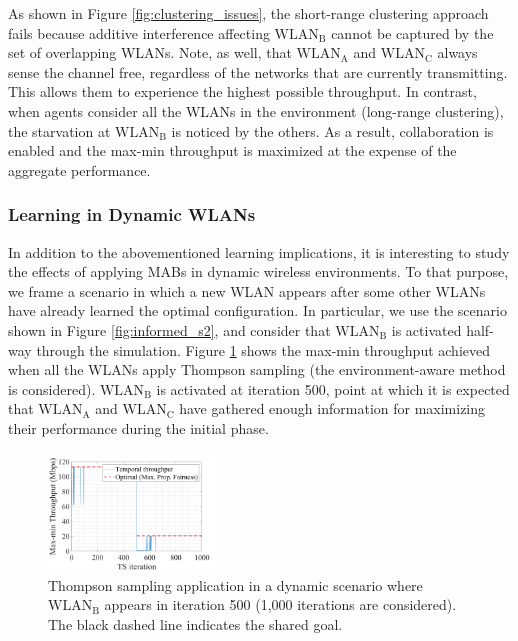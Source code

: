 \documentclass{article}
\begin{document}
As shown in Figure \ref{fig:clustering_issues}, the short-range clustering approach fails because additive interference affecting $\text{WLAN}_\text{B}$ cannot be captured by the set of overlapping WLANs. Note, as well, that $\text{WLAN}_\text{A}$ and $\text{WLAN}_\text{C}$ always sense the channel free, regardless of the networks that are currently transmitting. This allows them to experience the highest possible throughput. In contrast, when agents consider all the WLANs in the environment (long-range clustering), the starvation at $\text{WLAN}_\text{B}$ is noticed by the others. As a result, collaboration is enabled and the max-min throughput is maximized at the expense of the aggregate performance.

\subsubsection{Learning in Dynamic WLANs}

In addition to the abovementioned learning implications, it is interesting to study the effects of applying MABs in dynamic wireless environments. To that purpose, we frame a scenario in which a new WLAN appears after some other WLANs have already learned the optimal configuration. In particular, we use the scenario shown in Figure \ref{fig:informed_s2}, and consider that $\text{WLAN}_\text{B}$ is activated half-way through the simulation. Figure \ref{fig:dynamic_wlan} shows the max-min throughput achieved when all the WLANs apply Thompson sampling (the environment-aware method is considered). $\text{WLAN}_\text{B}$ is activated at iteration 500, point at which it is expected that $\text{WLAN}_\text{A}$ and $\text{WLAN}_\text{C}$ have gathered enough information for maximizing their performance during the initial phase.

\begin{figure}[h!]
	\centering   		
	\includegraphics[width=0.4\textwidth]{max_min_tpt_1_4}
	\caption{Thompson sampling application in a dynamic scenario where $\text{WLAN}_\text{B}$ appears in iteration 500 (1,000 iterations are considered). The black dashed line indicates the shared goal.}
	\label{fig:dynamic_wlan}
\end{figure}   	
\end{document}
